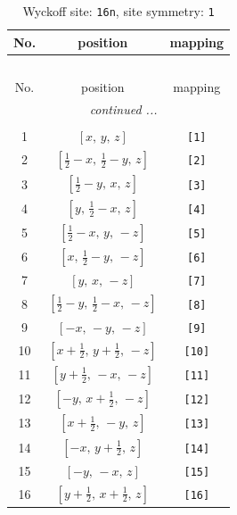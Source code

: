 \documentclass[fleqn,8pt]{jsarticle}
\begin{document}
\begin{longtable}{ccc}
\caption{Wyckoff site: {\tt 16n}, site symmetry: {\tt 1}}
 \\
 \hline \hline
No. & position & mapping \\ \hline \endfirsthead

\multicolumn{2}{l}{\tablename\ \thetable{}} \\
 \hline \hline
No. & position & mapping \\ \hline \endhead

 \hline \hline
\multicolumn{2}{r}{\footnotesize\it continued ...} \\ \endfoot

 \hline \hline
\multicolumn{2}{r}{} \\ \endlastfoot

1 & $\left[ x,\, y,\, z \right]$ & {\tt [1]} \\ \hline
2 & $\left[ \frac{1}{2} - x,\, \frac{1}{2} - y,\, z \right]$ & {\tt [2]} \\ \hline
3 & $\left[ \frac{1}{2} - y,\, x,\, z \right]$ & {\tt [3]} \\ \hline
4 & $\left[ y,\, \frac{1}{2} - x,\, z \right]$ & {\tt [4]} \\ \hline
5 & $\left[ \frac{1}{2} - x,\, y,\, - z \right]$ & {\tt [5]} \\ \hline
6 & $\left[ x,\, \frac{1}{2} - y,\, - z \right]$ & {\tt [6]} \\ \hline
7 & $\left[ y,\, x,\, - z \right]$ & {\tt [7]} \\ \hline
8 & $\left[ \frac{1}{2} - y,\, \frac{1}{2} - x,\, - z \right]$ & {\tt [8]} \\ \hline
9 & $\left[ - x,\, - y,\, - z \right]$ & {\tt [9]} \\ \hline
10 & $\left[ x + \frac{1}{2},\, y + \frac{1}{2},\, - z \right]$ & {\tt [10]} \\ \hline
11 & $\left[ y + \frac{1}{2},\, - x,\, - z \right]$ & {\tt [11]} \\ \hline
12 & $\left[ - y,\, x + \frac{1}{2},\, - z \right]$ & {\tt [12]} \\ \hline
13 & $\left[ x + \frac{1}{2},\, - y,\, z \right]$ & {\tt [13]} \\ \hline
14 & $\left[ - x,\, y + \frac{1}{2},\, z \right]$ & {\tt [14]} \\ \hline
15 & $\left[ - y,\, - x,\, z \right]$ & {\tt [15]} \\ \hline
16 & $\left[ y + \frac{1}{2},\, x + \frac{1}{2},\, z \right]$ & {\tt [16]} \\
\end{longtable}
\end{document}
